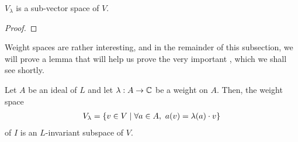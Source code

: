 \begin{boxlemma}
    $V_\lambda$ is a sub-vector space of $V$.
\end{boxlemma}
\begin{proof}
    \sorry
\end{proof}

Weight spaces are rather interesting, and in the remainder of this subsection, we will prove a lemma that will help us prove the very important , which we shall see shortly.

\begin{boxlemma}\label{Ch1:Lemma:InvarianceLemma}  %
    Let $A$ be an ideal of $L$ and let $\lambda : A \to \mathbb{C}$ be a weight on $A$. Then, the weight space
    \begin{align*}
        V_{\lambda} = \left\{ v \in V \; \middle\vert \; \forall a \in A,\ a(v) = \lambda(a) \cdot v \right\}
    \end{align*}
    of $I$ is an $L$-invariant subspace of $V$.
\end{boxlemma}
